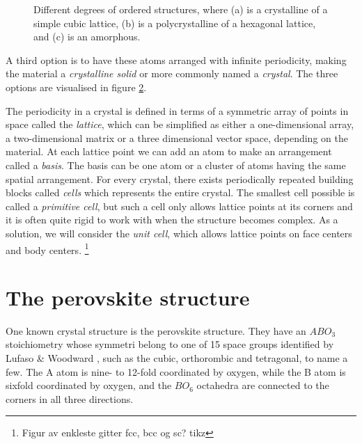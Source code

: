 \begin{figure}
\begin{subfigure}{1.0\linewidth}
\centering
{}
\subcaption{} \label{fig:M3}
\end{subfigure}
\par\bigskip
\caption{Different degrees of ordered structures, where (a) is a crystalline of a simple cubic lattice, (b) is a polycrystalline of a hexagonal lattice, and (c) is an amorphous. }
\label{fig:crystalstructure}
\end{figure}
A third option is to have these atoms arranged with infinite periodicity, making the material a \textit{crystalline solid} or more commonly named a \textit{crystal}. The three options are visualised in figure \ref{fig:crystalstructure}.

The periodicity in a crystal is defined in terms of a symmetric array of points in space called the \textit{lattice}, which can be simplified as either a one-dimensional array, a two-dimensional matrix or a three dimensional vector space, depending on the material. At each lattice point we can add an atom to make an arrangement called a \textit{basis}. The basis can be one atom or a cluster of atoms having the same spatial arrangement. For every crystal, there exists periodically repeated building blocks called \textit{cells} which represents the entire crystal. The smallest cell possible is called a \textit{primitive cell}, but such a cell only allows lattice points at its corners and it is often quite rigid to work with when the structure becomes complex. As a solution, we will consider the \textit{unit cell}, which allows lattice points on face centers and body centers. \footnote{Figur av enkleste gitter fcc, bcc og sc? tikz}

\section{The perovskite structure}

One known crystal structure is the perovskite structure. They have an $ABO_3$ stoichiometry whose symmetri belong to one of 15 space groups identified by Lufaso \& Woodward \cite{Lufaso2001}, such as the cubic, orthorombic and tetragonal, to name a few. The A atom is nine- to 12-fold coordinated by oxygen, while the B atom is sixfold coordinated by oxygen, and the $BO_6$ octahedra are connected to the corners in all three directions.

